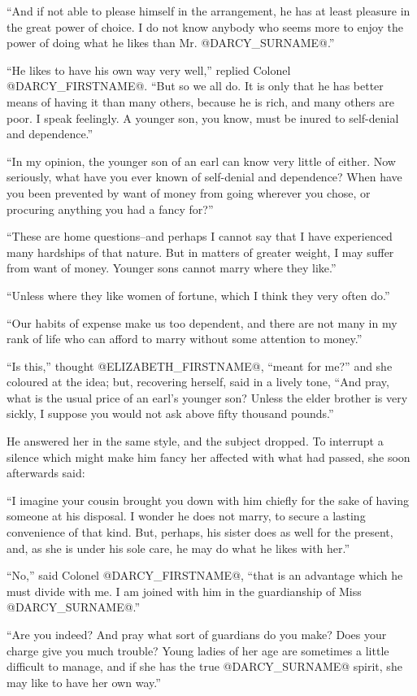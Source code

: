 ``And if not able to please himself in the arrangement, he has at least
pleasure in the great power of choice. I do not know anybody who seems
more to enjoy the power of doing what he likes than Mr. @DARCY_SURNAME@.''

``He likes to have his own way very well,'' replied Colonel @DARCY_FIRSTNAME@.
``But so we all do. It is only that he has better means of having it
than many others, because he is rich, and many others are poor. I speak
feelingly. A younger son, you know, must be inured to self-denial and
dependence.''

``In my opinion, the younger son of an earl can know very little of
either. Now seriously, what have you ever known of self-denial and
dependence? When have you been prevented by want of money from going
wherever you chose, or procuring anything you had a fancy for?''

``These are home questions--and perhaps I cannot say that I have
experienced many hardships of that nature. But in matters of greater
weight, I may suffer from want of money. Younger sons cannot marry where
they like.''

``Unless where they like women of fortune, which I think they very often
do.''

``Our habits of expense make us too dependent, and there are not many
in my rank of life who can afford to marry without some attention to
money.''

``Is this,'' thought @ELIZABETH_FIRSTNAME@, ``meant for me?'' and she coloured at the
idea; but, recovering herself, said in a lively tone, ``And pray, what
is the usual price of an earl's younger son? Unless the elder brother is
very sickly, I suppose you would not ask above fifty thousand pounds.''

He answered her in the same style, and the subject dropped. To interrupt
a silence which might make him fancy her affected with what had passed,
she soon afterwards said:

``I imagine your cousin brought you down with him chiefly for the sake of
having someone at his disposal. I wonder he does not marry, to secure a
lasting convenience of that kind. But, perhaps, his sister does as well
for the present, and, as she is under his sole care, he may do what he
likes with her.''

``No,'' said Colonel @DARCY_FIRSTNAME@, ``that is an advantage which he must
divide with me. I am joined with him in the guardianship of Miss @DARCY_SURNAME@.''

``Are you indeed? And pray what sort of guardians do you make? Does your
charge give you much trouble? Young ladies of her age are sometimes a
little difficult to manage, and if she has the true @DARCY_SURNAME@ spirit, she
may like to have her own way.''

